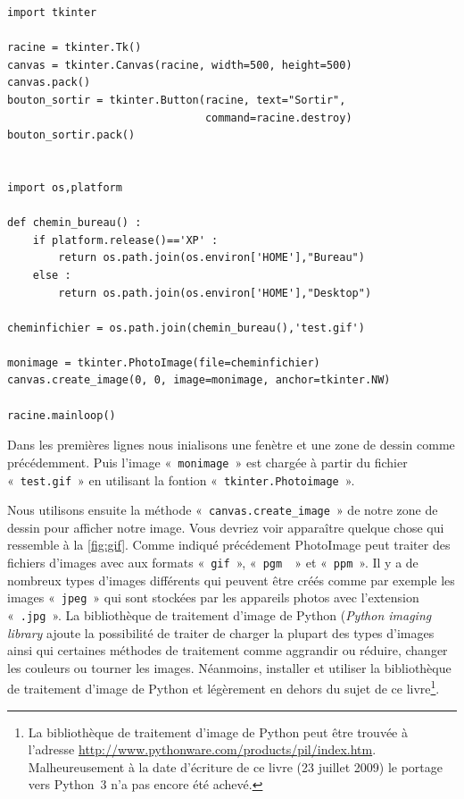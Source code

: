 \begin{Verbatim}[frame=single,rulecolor=\color{mbleu}, label=à taper]
import tkinter

racine = tkinter.Tk()
canvas = tkinter.Canvas(racine, width=500, height=500)
canvas.pack()
bouton_sortir = tkinter.Button(racine, text="Sortir",
                               command=racine.destroy)
bouton_sortir.pack()


import os,platform

def chemin_bureau() :
    if platform.release()=='XP' :
        return os.path.join(os.environ['HOME'],"Bureau")
    else :
        return os.path.join(os.environ['HOME'],"Desktop")
    
cheminfichier = os.path.join(chemin_bureau(),'test.gif')

monimage = tkinter.PhotoImage(file=cheminfichier)
canvas.create_image(0, 0, image=monimage, anchor=tkinter.NW)

racine.mainloop()
\end{Verbatim}

Dans les premières lignes nous inialisons une fenètre et une zone de dessin comme précédemment.
Puis l'image «~\texttt{monimage}~» est chargée à partir du fichier «~\texttt{test.gif}~» en utilisant la fontion «~\texttt{tkinter.Photoimage}~».

Nous utilisons ensuite la méthode «~\texttt{canvas.create\_image}~» de notre zone de dessin pour afficher notre image. Vous devriez voir apparaître quelque chose qui ressemble à la \autoref{fig:gif}. Comme indiqué précédement PhotoImage peut traiter des fichiers d'images avec aux formats «~\texttt{gif}~», «~\texttt{pgm~}~» et «~\texttt{ppm}~».
Il y a de nombreux types d'images différents qui peuvent être créés comme par exemple les images «~\texttt{jpeg}~» qui sont stockées par les appareils photos avec l'extension «~\texttt{.jpg}~». 
La bibliothèque de traitement d'image de Python (\emph{Python imaging library} ajoute la possibilité de traiter de charger la plupart des types d'images ainsi qui certaines méthodes de traitement comme aggrandir ou réduire, changer les couleurs ou tourner les images.  Néanmoins, installer et utiliser la bibliothèque de traitement d'image de Python et légèrement en dehors du sujet de ce livre\footnote{La  bibliothèque de traitement d'image de Python peut être trouvée à l'adresse \url{http://www.pythonware.com/products/pil/index.htm}. Malheureusement à la date d'écriture de ce livre (23 juillet 2009) le portage vers Python~3 n'a pas encore été achevé.}. 

